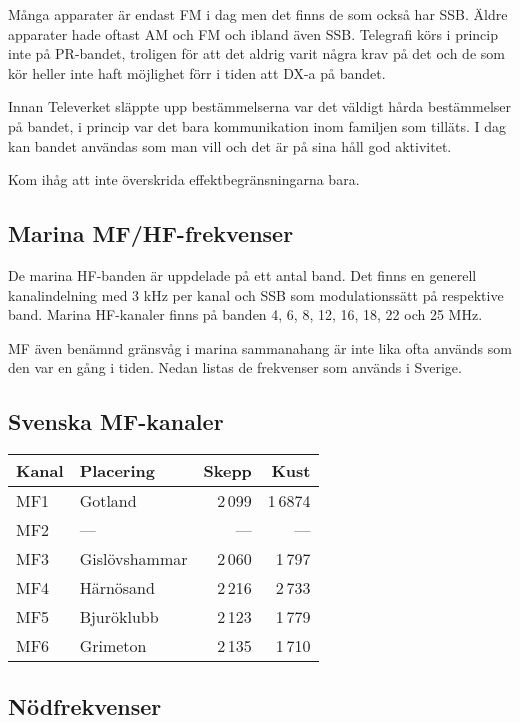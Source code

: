 Många apparater är endast FM i dag men det finns de som också har SSB. Äldre
apparater hade oftast AM och FM och ibland även SSB. Telegrafi körs i princip
inte på PR-bandet, troligen för att det aldrig varit några krav på det och de
som kör heller inte haft möjlighet förr i tiden att DX-a på bandet.

Innan Televerket släppte upp bestämmelserna var det väldigt hårda bestämmelser
på bandet, i princip var det bara kommunikation inom familjen som tilläts. I dag
kan bandet användas som man vill och det är på sina håll god aktivitet.

Kom ihåg att inte överskrida effektbegränsningarna bara.

\subsection{Marina MF/HF-frekvenser}

De marina HF-banden är uppdelade på ett antal band. Det finns en
generell kanalindelning med 3 kHz per kanal och SSB som
modulationssätt på respektive band. Marina HF-kanaler finns på banden
4, 6, 8, 12, 16, 18, 22 och 25 MHz.

MF även benämnd gränsvåg i marina sammanahang är inte lika ofta
används som den var en gång i tiden. Nedan listas de frekvenser som
används i Sverige.

\subsection{Svenska MF-kanaler}

\begin{longtable}{llrr}
\textbf{Kanal} & \textbf{Placering} & \textbf{Skepp} & \textbf{Kust}  \\ \hline
\endhead

MF1 & Gotland       & 2\,099 & 1\,6874 \\
MF2 & ---           & ---  & ---   \\
MF3 & Gislövshammar & 2\,060 & 1\,797  \\
MF4 & Härnösand     & 2\,216 & 2\,733  \\
MF5 & Bjuröklubb    & 2\,123 & 1\,779  \\
MF6 & Grimeton      & 2\,135 & 1\,710
\end{longtable}

\subsection{Nödfrekvenser}

